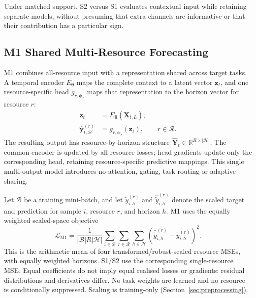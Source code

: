 \documentclass[5p,twocolumn]{elsarticle}
\begin{document}
Under matched support, S2 versus S1 evaluates contextual input while retaining
separate models, without presuming that extra channels are informative or
that their contribution has a particular sign.

\subsection{M1 Shared Multi-Resource Forecasting}
\label{sec:m1}

M1 combines all-resource input with a representation shared across target
tasks. A temporal encoder $E_{\boldsymbol{\theta}}$ maps the complete context
to a latent vector $\mathbf{z}_t$, and one resource-specific head
$g_{r,\boldsymbol{\phi}_r}$ maps that representation to the horizon vector for
resource $r$:
\begin{equation}
  \begin{aligned}
    \mathbf{z}_t
      &= E_{\boldsymbol{\theta}}(\mathbf{X}_{t,L}), \\
    \widehat{\mathbf{y}}_{t,\mathcal{H}}^{(r)}
      &= g_{r,\boldsymbol{\phi}_r}(\mathbf{z}_t),
      && r\in\mathcal{R}.
  \end{aligned}
  \label{eq:m1-forecast}
\end{equation}
The resulting output has resource-by-horizon structure
$\widehat{\mathbf{Y}}_{t}\in\mathbb{R}^{R\times|\mathcal{H}|}$.
The common encoder is updated by all resource losses; head gradients update
only the corresponding head, retaining resource-specific predictive mappings.
This single multi-output model introduces no attention, gating, task routing
or adaptive sharing.

Let $\mathcal{B}$ be a training mini-batch, and let
$\widetilde{y}_{i,h}^{(r)}$ and
$\widehat{\widetilde{y}}_{i,h}^{(r)}$ denote the scaled target and prediction
for sample $i$, resource $r$, and horizon $h$. M1 uses the equally weighted
scaled-space objective
\begin{equation}
  \mathcal{L}_{\mathrm{M1}}
  = \frac{1}{|\mathcal{B}|R|\mathcal{H}|}
    \sum_{i\in\mathcal{B}}
    \sum_{r\in\mathcal{R}}
    \sum_{h\in\mathcal{H}}
    \left(
      \widehat{\widetilde{y}}_{i,h}^{(r)}
      - \widetilde{y}_{i,h}^{(r)}
    \right)^2.
  \label{eq:m1-loss}
\end{equation}
This is the arithmetic mean of four transformed/robust-scaled resource MSEs,
with equally weighted horizons. S1/S2 use the corresponding single-resource
MSE. Equal coefficients do not imply equal realised losses or gradients:
residual distributions and derivatives differ. No task weights are learned
and no resource is conditionally suppressed. Scaling is training-only
(Section~\ref{sec:preprocessing}).
\end{document}
